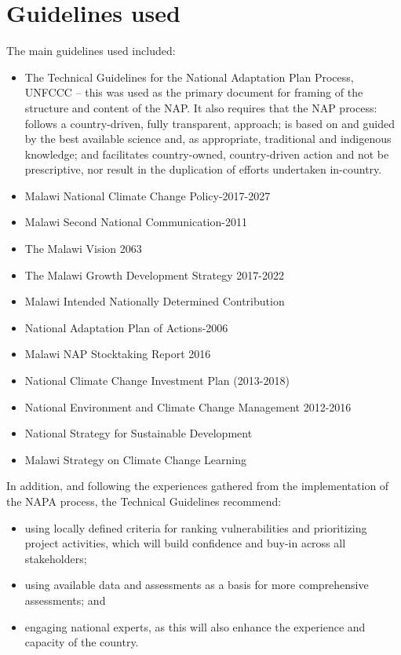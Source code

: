 \documentclass[
]{book}
\providecommand{\tightlist}{%
  \setlength{\itemsep}{0pt}\setlength{\parskip}{0pt}}
\begin{document}
\hypertarget{guidelines-used}{%
\section{Guidelines used}\label{guidelines-used}}

The main guidelines used included:

\begin{itemize}
\tightlist
\item
  The Technical Guidelines for the National Adaptation Plan Process, UNFCCC -- this was used as the primary document for framing of the structure and content of the NAP. It also requires that the NAP process: follows a country-driven, fully transparent, approach; is based on and guided by the best available science and, as appropriate, traditional and indigenous knowledge; and facilitates country-owned, country-driven action and not be prescriptive, nor result in the duplication of efforts undertaken in-country.
\item
  Malawi National Climate Change Policy-2017-2027
\item
  Malawi Second National Communication-2011
\item
  The Malawi Vision 2063
\item
  The Malawi Growth Development Strategy 2017-2022
\item
  Malawi Intended Nationally Determined Contribution
\item
  National Adaptation Plan of Actions-2006
\item
  Malawi NAP Stocktaking Report 2016
\item
  National Climate Change Investment Plan (2013-2018)
\item
  National Environment and Climate Change Management 2012-2016
\item
  National Strategy for Sustainable Development
\item
  Malawi Strategy on Climate Change Learning
\end{itemize}

In addition, and following the experiences gathered from the implementation of the NAPA process, the Technical Guidelines recommend:

\begin{itemize}
\tightlist
\item
  using locally defined criteria for ranking vulnerabilities and prioritizing project activities, which will build confidence and buy-in across all stakeholders;
\item
  using available data and assessments as a basis for more comprehensive assessments; and
\item
  engaging national experts, as this will also enhance the experience and capacity of the country.
\end{itemize}
\end{document}
